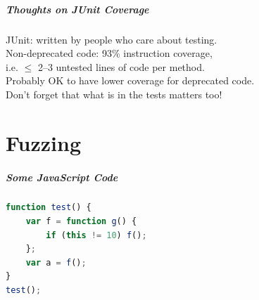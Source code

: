 \documentclass{beamer}
\newenvironment{changemargin}[1]{%
  \begin{list}{}{%
    \setlength{\topsep}{0pt}%
    \setlength{\leftmargin}{#1}%
    \setlength{\rightmargin}{1em}
    \setlength{\listparindent}{\parindent}%
    \setlength{\itemindent}{\parindent}%
    \setlength{\parsep}{\parskip}%
  }%
  \item[]}{\end{list}}
\begin{document}
\begin{frame}
  \frametitle{Thoughts on JUnit Coverage}
\begin{changemargin}{2em}
  JUnit: written by people who care about testing.\\[1em]

  Non-deprecated code: 93\% instruction coverage, \\
  \hspace*{2em} i.e. $\le$ 2--3 untested lines of code per method.\\[1em]

  Probably OK to have lower coverage for deprecated code.\\[1em]

  Don't forget that what is in the tests matters too!
\end{changemargin}
\end{frame}

\part{Fuzzing}
\begin{frame}
  \partpage
\end{frame}

\usebackgroundtemplate{}

\begin{frame}[fragile]
  \frametitle{Some JavaScript Code}
\begin{changemargin}{2em}
\begin{lstlisting}[language=JavaScript]
function test() {
    var f = function g() {
        if (this != 10) f();
    };
    var a = f();
}
test();
\end{lstlisting}
\end{changemargin}

\end{frame}
\end{document}
